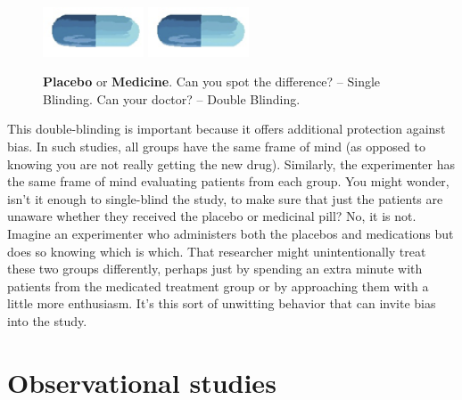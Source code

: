 \documentclass[11pt, chapterprefix=true]{scrbook}\usepackage[]{graphicx}\usepackage[]{color}
\begin{document}

\begin{figure}[ht]
   \centering

   \includegraphics[width=3cm]{chapters/Chapter_9/ext_figure/placebo.png}
   \includegraphics[width=3cm]{chapters/Chapter_9/ext_figure/medicine.png}
    \caption{\textbf{Placebo} or \textbf{Medicine}.  Can you spot the difference? -- Single Blinding.
Can your doctor? -- Double Blinding. }
\end{figure}

This double-blinding is important because it offers additional protection against bias. In such studies, all groups have the same frame of mind (as opposed to knowing you are not really getting the new drug). Similarly, the experimenter has the same frame of mind evaluating patients from each group. You might wonder, isn't it enough to single-blind the study, to make sure that just the patients are unaware whether they received the placebo or medicinal pill? No, it is not. Imagine an experimenter who administers both the placebos and medications but does so knowing which is which. That researcher might unintentionally treat these two groups differently, perhaps just by spending an extra minute with patients from the medicated treatment group or by approaching them with a little more enthusiasm. It's this sort of unwitting behavior that can invite bias into the study.

\section{Observational studies}
\end{document}
